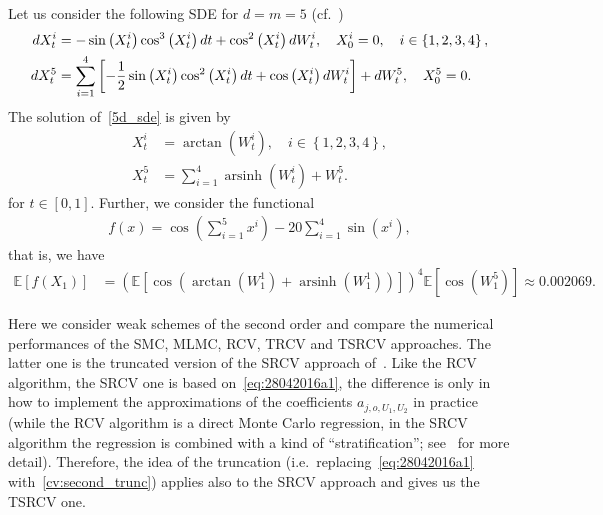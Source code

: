 \documentclass[11pt,a4paper]{amsart}
\theoremstyle{plain}
\theoremstyle{definition}
\theoremstyle{remark}
\numberwithin{equation}{section}
\begin{document}
Let us consider the following SDE for $d=m=5$ (cf.~\cite{belomestny2016variance})
\begin{align}
\notag
dX_t^i&=-\sin\left(X_t^i\right)\cos^3\left(X_t^i\right)dt+\cos^2\left(X_t^i\right)dW_t^i,\quad X_0^i=0,\quad i\in\left\{1,2,3,4\right\},\\
\label{5d_sde}
dX_t^5&=\sum_{i=1}^4\left[-\frac{1}{2}\sin\left(X_t^i\right)\cos^2\left(X_t^i\right)dt+\cos\left(X_t^i\right)
dW_t^i\right]+dW_t^5,\quad X_0^5=0.
\end{align}
The solution of~\eqref{5d_sde} is given by
\begin{align*}
X_t^i&=\arctan\left(W_t^i\right),\quad i\in\left\{1,2,3,4\right\},\\
X_t^5&=\sum_{i=1}^4\operatorname{arsinh}\left(W_t^i\right)
+W_t^5.
\end{align*}
for $t\in\left[0,1\right]$. Further, we consider the functional 
\begin{align*}
f(x)=\cos\left(\sum_{i=1}^5x^i\right)-20\sum_{i=1}^4\sin\left(x^i\right),
\end{align*}
that is, we have
\begin{align*}
\mathbb{E}\left[f\left(X_1\right)\right]&=\left(\mathbb{E}\left[\cos\left(
\arctan\left(W_1^1\right)+\operatorname{arsinh}\left(W_1^1\right)\right)\right]\right)^4
\mathbb{E}\left[\cos\left(W_1^5\right)\right]
\approx 0.002069.
\end{align*}

Here we consider weak schemes of the second order
and compare the numerical performances
of the SMC, MLMC, RCV, TRCV and TSRCV approaches.
The latter one is the truncated version
of the SRCV approach of~\cite{belomestny2016stratified}.
Like the RCV algorithm,
the SRCV one is based on~\eqref{eq:28042016a1},
the difference is only in how to implement
the approximations of the coefficients
$a_{j,o,U_1,U_2}$ in practice
(while the RCV algorithm is a direct Monte Carlo regression,
in the SRCV algorithm the regression is combined
with a kind of ``stratification''; see~\cite{belomestny2016stratified} for more detail).
Therefore, the idea of the truncation
(i.e.\ replacing~\eqref{eq:28042016a1} with~\eqref{cv:second_trunc})
applies also to the SRCV approach
and gives us the TSRCV one.
\end{document}
